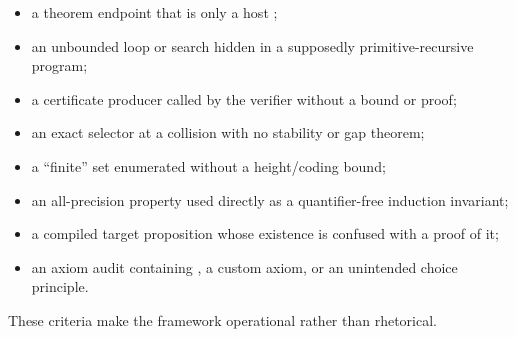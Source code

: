 \begin{itemize}
  \item a theorem endpoint that is only a host ;
  \item an unbounded loop or search hidden in a supposedly primitive-recursive program;
  \item a certificate producer called by the verifier without a bound or proof;
  \item an exact selector at a collision with no stability or gap theorem;
  \item a ``finite'' set enumerated without a height/coding bound;
  \item an all-precision property used directly as a quantifier-free induction invariant;
  \item a compiled target proposition whose existence is confused with a proof of it;
  \item an axiom audit containing , a custom axiom, or an unintended choice principle.
\end{itemize}

These criteria make the framework operational rather than rhetorical.
